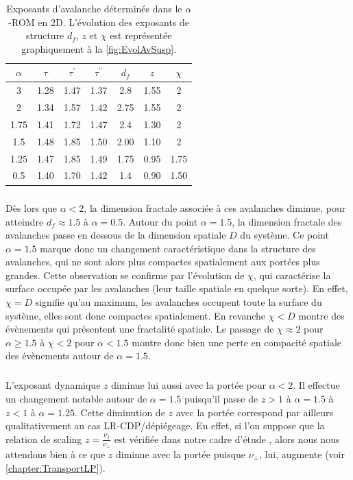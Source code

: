 \begin{table}[h]
\centering
\begin{tabular}{ccccccc}
\hline \hline $\alpha$ & $\tau$ & \multicolumn{1}{c}{$\tau^\prime$} & $\tau^{\prime\prime}$ & $d_f$ & $z$ & $\chi$ \\
\hline 3 & 1.28 & 1.47 & 1.37 & 2.8 & 1.55 & 2 \\
2 & 1.34 & 1.57 & 1.42 & 2.75 & 1.55 & 2 \\
1.75 & 1.41 & 1.72 & 1.47 & 2.4 & 1.30 & 2 \\
1.5 & 1.48 & 1.85 & 1.50 & 2.00 & 1.10 & 2 \\
1.25 & 1.47 & 1.85 & 1.49 & 1.75 & 0.95 & 1.75 \\
0.5 & 1.40 & 1.70 & 1.42 & 1.4 & 0.90 & 1.50\\
\hline \hline
\end{tabular}
\caption{Exposants d'avalanche déterminés dans le $\alpha$-ROM en 2D. L'évolution des exposants de structure $d_f$, $z$ et $\chi$ est représentée graphiquement à la \autoref{fig:EvolAvSusp}.}
\label{tab:expocritavsusp}
\end{table}

\subparagraph{}Dès lors que $\alpha < 2$, la dimension fractale associée à ces avalanches diminue, pour atteindre $d_f \approx 1.5$ à $\alpha = 0.5$. Autour du point $\alpha = 1.5$, la dimension fractale des avalanches passe en dessous de la dimension spatiale $D$ du système. Ce point $\alpha = 1.5$ marque donc un changement caractéristique dans la structure des avalanches, qui ne sont alors plus compactes spatialement aux portées plus grandes. Cette observation se confirme par l'évolution de $\chi$, qui caractérise la surface occupée par les avalanches (leur taille spatiale en quelque sorte). En effet, $\chi = D$ signifie qu'au maximum, les avalanches occupent toute la surface du système, elles sont donc compactes spatialement. En revanche $\chi < D$ montre des évènements qui présentent une fractalité spatiale. Le passage de $\chi\approx 2$ pour $\alpha\geq 1.5$ à $\chi < 2$ pour $\alpha < 1.5$ montre donc bien une perte en compacité spatiale des évènements autour de $\alpha = 1.5$.

\subparagraph{}L'exposant dynamique $z$ diminue lui aussi avec la portée pour $\alpha<2$. Il effectue un changement notable autour de $\alpha = 1.5$ puisqu'il passe de $z>1$ à $\alpha=1.5$ à $z<1$ à $\alpha=1.25$. Cette diminution de $z$ avec la portée correspond par ailleurs qualitativement au cas LR-CDP/dépiégeage. En effet, si l'on suppose que la relation de scaling $z = \frac{\nu_\parallel}{\nu_\perp}$ est vérifiée dans notre cadre d'étude \cite{lubeck_universal_2004}, alors nous nous attendons bien à ce que $z$ diminue avec la portée puisque $\nu_\perp$, lui, augmente (voir \autoref{chapter:TransportLP}).


